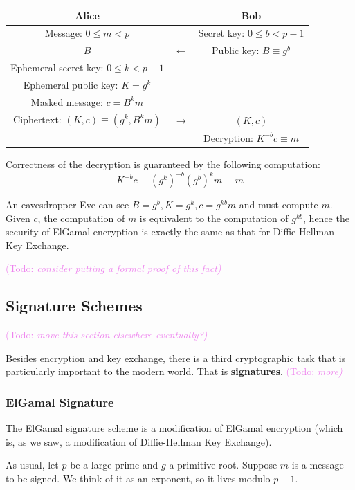 \documentclass{article}
\theoremstyle{plain}
\theoremstyle{definition}
\theoremstyle{remark}
\numberwithin{theorem}{section}
\newcommand{\KS}[1]{\textcolor{violet}{{\sf (Todo:} {\sl{#1})}}}
\newcommand{\KS}[1]{}
\begin{document}
     \begin{tabular}{ccc}
       Alice & & Bob \\
       \hline
       Message: $0 \le m < p$ & &  Secret key: $0 \le b < p-1$ \\
       $B$ & $\longleftarrow$ & Public key: $B \equiv g^b$ \\
       Ephemeral secret key: $0 \le k < p-1$ & &  \\
       Ephemeral public key: $K = g^k$ & &  \\
       Masked message: $c = B^k m$ & &  \\
       Ciphertext: $(K,c) \equiv (g^k, B^k m)$ & $\longrightarrow$ & $(K,c)$ \\
					      & & Decryption: $K^{-b}c \equiv m$ \\
      \end{tabular}
      \vspace{3em}
      

      Correctness of the decryption is guaranteed by the following computation:
      \[
	      K^{-b}c \equiv (g^{k})^{-b}(g^{b})^{k}m \equiv m
      \]


      An eavesdropper Eve can see $B = g^b, K = g^k, c = g^{kb} m$ and must compute $m$.
      Given $c$, the computation of $m$ is equivalent to the computation of $g^{kb}$, hence the security of ElGamal encryption is exactly the same as that for Diffie-Hellman Key Exchange.

      \KS{consider putting a formal proof of this fact}

      \subsection{Signature Schemes}

      \KS{move this section elsewhere eventually?}

      Besides encryption and key exchange, there is a third cryptographic task that is particularly important to the modern world.  That is \textbf{signatures}.  \KS{more}

\subsubsection{ElGamal Signature}

The ElGamal signature scheme is a modification of ElGamal encryption (which is, as we saw, a modification of Diffie-Hellman Key Exchange).  

As usual, let $p$ be a large prime and $g$ a primitive root.
Suppose $m$ is a message to be signed.  We think of it as an exponent, so it lives modulo $p-1$.
\end{document}
